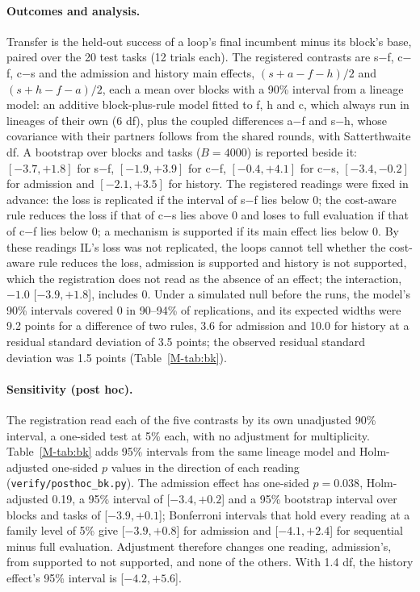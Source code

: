 \documentclass[11pt]{article}
\begin{document}
\paragraph{Outcomes and analysis.} Transfer is the held-out success of a loop's final incumbent minus its block's base, paired over the 20 test tasks (12 trials each). The registered contrasts are s$-$f, c$-$f, c$-$s and the admission and history main effects, $(s+a-f-h)/2$ and $(s+h-f-a)/2$, each a mean over blocks with a 90\% interval from a lineage model: an additive block-plus-rule model fitted to f, h and c, which always run in lineages of their own (6 df), plus the coupled differences a$-$f and s$-$h, whose covariance with their partners follows from the shared rounds, with Satterthwaite df. A bootstrap over blocks and tasks ($B=4000$) is reported beside it: $[-3.7,+1.8]$ for s$-$f, $[-1.9,+3.9]$ for c$-$f, $[-0.4,+4.1]$ for c$-$s, $[-3.4,-0.2]$ for admission and $[-2.1,+3.5]$ for history. The registered readings were fixed in advance: the loss is replicated if the interval of s$-$f lies below 0; the cost-aware rule reduces the loss if that of c$-$s lies above 0 and loses to full evaluation if that of c$-$f lies below 0; a mechanism is supported if its main effect lies below 0. By these readings IL's loss was not replicated, the loops cannot tell whether the cost-aware rule reduces the loss, admission is supported and history is not supported, which the registration does not read as the absence of an effect; the interaction, $-1.0$ [$-3.9,+1.8$], includes 0. Under a simulated null before the runs, the model's 90\% intervals covered 0 in 90--94\% of replications, and its expected widths were 9.2 points for a difference of two rules, 3.6 for admission and 10.0 for history at a residual standard deviation of 3.5 points; the observed residual standard deviation was 1.5 points (Table~\ref*{M-tab:bk}).

\paragraph{Sensitivity (post hoc).} The registration read each of the five contrasts by its own unadjusted 90\% interval, a one-sided test at 5\% each, with no adjustment for multiplicity. Table~\ref*{M-tab:bk} adds 95\% intervals from the same lineage model and Holm-adjusted one-sided $p$ values in the direction of each reading (\texttt{verify/posthoc\_bk.py}). The admission effect has one-sided $p=0.038$, Holm-adjusted 0.19, a 95\% interval of [$-3.4,+0.2$] and a 95\% bootstrap interval over blocks and tasks of [$-3.9,+0.1$]; Bonferroni intervals that hold every reading at a family level of 5\% give [$-3.9,+0.8$] for admission and [$-4.1,+2.4$] for sequential minus full evaluation. Adjustment therefore changes one reading, admission's, from supported to not supported, and none of the others. With 1.4 df, the history effect's 95\% interval is [$-4.2,+5.6$].
\end{document}
